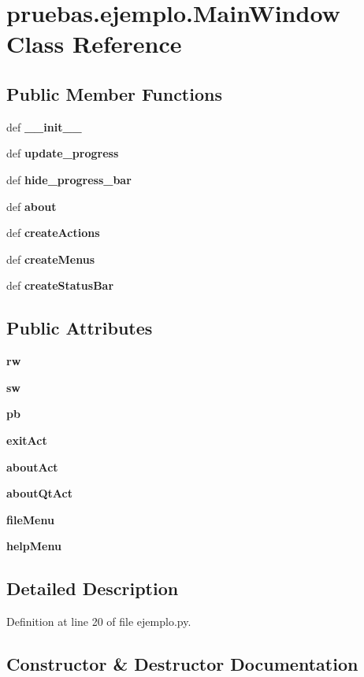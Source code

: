 \section{pruebas.\-ejemplo.\-Main\-Window \-Class \-Reference}
\label{classpruebas_1_1ejemplo_1_1_main_window}
\subsection*{\-Public \-Member \-Functions}
\begin{DoxyCompactItemize}
\item 
def {\bf \-\_\-\-\_\-init\-\_\-\-\_\-}
\item 
def {\bf update\-\_\-progress}
\item 
def {\bf hide\-\_\-progress\-\_\-bar}
\item 
def {\bf about}
\item 
def {\bf create\-Actions}
\item 
def {\bf create\-Menus}
\item 
def {\bf create\-Status\-Bar}
\end{DoxyCompactItemize}
\subsection*{\-Public \-Attributes}
\begin{DoxyCompactItemize}
\item 
{\bf rw}
\item 
{\bf sw}
\item 
{\bf pb}
\item 
{\bf exit\-Act}
\item 
{\bf about\-Act}
\item 
{\bf about\-Qt\-Act}
\item 
{\bf file\-Menu}
\item 
{\bf help\-Menu}
\end{DoxyCompactItemize}


\subsection{\-Detailed \-Description}


\-Definition at line 20 of file ejemplo.\-py.



\subsection{\-Constructor \& \-Destructor \-Documentation}
